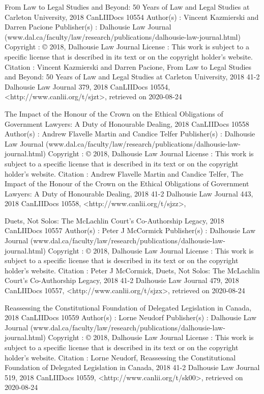 From Law to Legal Studies and Beyond: 50 Years of Law and Legal Studies at Carleton University, 2018 CanLIIDocs 10554
Author(s) : 	Vincent Kazmierski and Darren Pacione
Publisher(s) : 	Dalhousie Law Journal (www.dal.ca/faculty/law/research/publications/dalhousie-law-journal.html)
Copyright : 	© 2018, Dalhousie Law Journal
License : 	This work is subject to a specific license that is described in its text or on the copyright holder's website.
Citation : 	Vincent Kazmierski and Darren Pacione, From Law to Legal Studies and Beyond: 50 Years of Law and Legal Studies at Carleton University, 2018 41-2 Dalhousie Law Journal 379, 2018 CanLIIDocs 10554, <http://www.canlii.org/t/sjzt>, retrieved on 2020-08-24



The Impact of the Honour of the Crown on the Ethical Obligations of Government Lawyers: A Duty of Honourable Dealing, 2018 CanLIIDocs 10558
Author(s) : 	Andrew Flavelle Martin and Candice Telfer
Publisher(s) : 	Dalhousie Law Journal (www.dal.ca/faculty/law/research/publications/dalhousie-law-journal.html)
Copyright : 	© 2018, Dalhousie Law Journal
License : 	This work is subject to a specific license that is described in its text or on the copyright holder's website.
Citation : 	Andrew Flavelle Martin and Candice Telfer, The Impact of the Honour of the Crown on the Ethical Obligations of Government Lawyers: A Duty of Honourable Dealing, 2018 41-2 Dalhousie Law Journal 443, 2018 CanLIIDocs 10558, <http://www.canlii.org/t/sjzz>, 



Duets, Not Solos: The McLachlin Court’s Co-Authorship Legacy, 2018 CanLIIDocs 10557
Author(s) : 	Peter J McCormick
Publisher(s) : 	Dalhousie Law Journal (www.dal.ca/faculty/law/research/publications/dalhousie-law-journal.html)
Copyright : 	© 2018, Dalhousie Law Journal
License : 	This work is subject to a specific license that is described in its text or on the copyright holder's website.
Citation : 	Peter J McCormick, Duets, Not Solos: The McLachlin Court’s Co-Authorship Legacy, 2018 41-2 Dalhousie Law Journal 479, 2018 CanLIIDocs 10557, <http://www.canlii.org/t/sjzx>, retrieved on 2020-08-24



Reassessing the Constitutional Foundation of Delegated Legislation in Canada, 2018 CanLIIDocs 10559
Author(s) : 	Lorne Neudorf
Publisher(s) : 	Dalhousie Law Journal (www.dal.ca/faculty/law/research/publications/dalhousie-law-journal.html)
Copyright : 	© 2018, Dalhousie Law Journal
License : 	This work is subject to a specific license that is described in its text or on the copyright holder's website.
Citation : 	Lorne Neudorf, Reassessing the Constitutional Foundation of Delegated Legislation in Canada, 2018 41-2 Dalhousie Law Journal 519, 2018 CanLIIDocs 10559, <http://www.canlii.org/t/sk00>, retrieved on 2020-08-24



